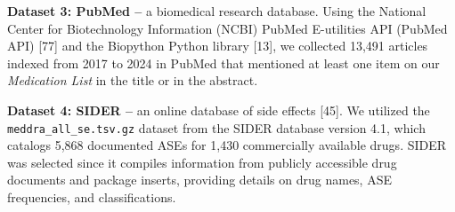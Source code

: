 \documentclass[referee,bst/sn-basic]{sn-jnl}%
\begin{document}
\begin{comment}
    
\begin{table}[h]
\caption{Subreddits that were used to collect social media posts involving GLP-1 RAs.}
\label{tbl:reddit}
\centering
\begin{tabular}{ll}
\toprule
Subreddit               & \# Members$^*$ \\
\midrule
r/diabetes            & 109K \\
r/diabetes\_t2            & 29.4K \\
r/GLP1       & 1.3K \\
r/liraglutide            & 11.7K \\
r/loseit         & 3900K \\
r/MaintenancePhase             & 25.6K \\
r/medicine           & 453K \\
r/Ozempic                  & 50.1K \\
r/OzempicForWeightLoss     & 13.7K \\
r/semaglutidecompounds           & 7.2K \\
r/Semaglutide              & 45K \\
r/TheMorningToastSnark              & 11.6K \\
r/trulicity              & 1.1K \\
r/type2diabetes           & 8.4K \\
\bottomrule
\end{tabular}
$^*$Number of members (in thousands) of each subreddit as of October 2, 2023.
\end{table}

\end{comment}

\textbf{Dataset 3: PubMed --}
a biomedical research database.
Using the National Center for Biotechnology Information (NCBI) PubMed E-utilities API (PubMed API) [77] 
and the Biopython Python library [13], 
we collected 13,491 articles indexed from 2017 to 2024 in PubMed that mentioned at least one item on our \textit{Medication List} in the title or in the abstract.

\textbf{Dataset 4: SIDER -- }
an online database of side effects [45]. 
We utilized the \texttt{meddra\_all\_se.tsv.gz} dataset from the SIDER database version 4.1, which catalogs 5,868 documented ASEs for 1,430 commercially available drugs. 
SIDER was selected since it compiles information from publicly accessible drug documents and package inserts, providing details on drug names, ASE frequencies, and classifications.
\end{document}
